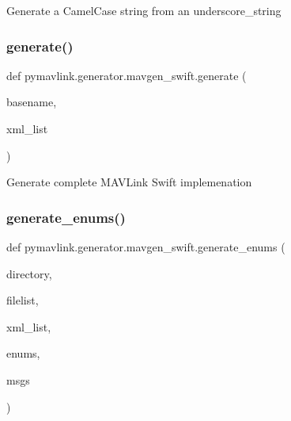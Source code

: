 \begin{DoxyVerb}Generate a CamelCase string from an underscore_string\end{DoxyVerb}
 \mbox{\label{namespacepymavlink_1_1generator_1_1mavgen__swift_a0435c038175b5fff7394838ccebd9c64}} 
\subsubsection{\texorpdfstring{generate()}{generate()}}
{\footnotesize\ttfamily def pymavlink.\+generator.\+mavgen\+\_\+swift.\+generate (\begin{DoxyParamCaption}\item[{}]{basename,  }\item[{}]{xml\+\_\+list }\end{DoxyParamCaption})}

\begin{DoxyVerb}Generate complete MAVLink Swift implemenation\end{DoxyVerb}
 \mbox{\label{namespacepymavlink_1_1generator_1_1mavgen__swift_a5603cdc6a0d7d2a8610a00132cc8cce5}} 
\subsubsection{\texorpdfstring{generate\+\_\+enums()}{generate\_enums()}}
{\footnotesize\ttfamily def pymavlink.\+generator.\+mavgen\+\_\+swift.\+generate\+\_\+enums (\begin{DoxyParamCaption}\item[{}]{directory,  }\item[{}]{filelist,  }\item[{}]{xml\+\_\+list,  }\item[{}]{enums,  }\item[{}]{msgs }\end{DoxyParamCaption})}


